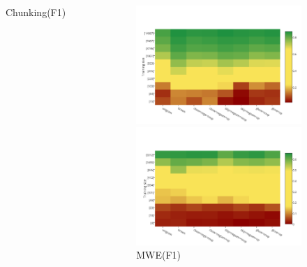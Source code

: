 \documentclass{beamer}
\newcommand{\task}[1]{\textsf{#1}\xspace}
\newcommand{\chunking}{\task{Chunking}}
\newcommand{\ner}{\task{NER}}
\newcommand{\mwe}{\task{MWE}}
\newcommand{\evmeasure}[1]{\textsc{#1}\xspace}
\newcommand{\fscore}{\evmeasure{F1}}
\begin{document}
\begin{frame}[plain]
\begin{columns}
\begin{figure}
   	\caption{\chunking (\fscore)}		
  \end{figure}  
    \begin{figure}
    \includegraphics[scale=0.22]{../plots/map-ner-color-invert}    	
	\caption{\ner (\fscore)}	
	\vspace{-0.3cm}
    \includegraphics[scale=0.22]{../plots/map-mwe-color-invert}
	\caption{\mwe (\fscore)}	
     \end{figure}
\end{columns}
\end{frame}
\end{document}
